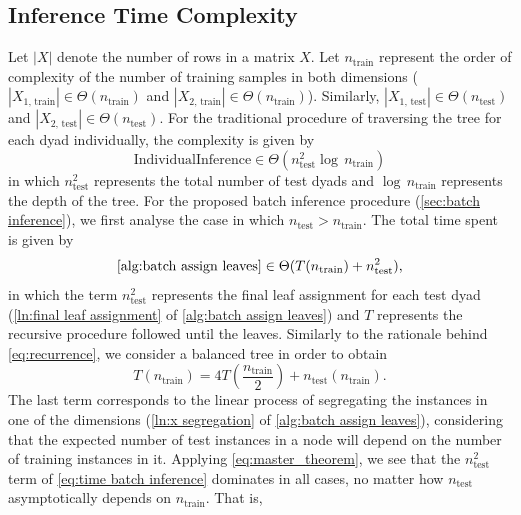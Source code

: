 \begin{appendices}
\subsection{Inference Time Complexity}
\label{sec:predict complexity analysis}
Let $|X|$ denote the number of rows in a matrix $X$.
Let $n_\text{train}$ represent the order of complexity of the number of training samples in both dimensions ($|X_\text{1, train}| \in \Theta(n_\text{train})$ and $|X_\text{2, train}| \in \Theta(n_\text{train})$). Similarly, $|X_\text{1, test}| \in \Theta(n_\text{test})$ and $|X_\text{2, test}| \in \Theta(n_\text{test})$.
For the traditional procedure of traversing the tree for each dyad individually, the complexity is given by
\begin{equation}
    \text{IndividualInference} \in \Theta(n_\text{test}^2\log\, n_\text{train})
\end{equation}
in which $n_\text{test}^2$ represents the total number of test dyads and $\log\, n_\text{train}$ represents the depth of the tree.
For the proposed batch inference procedure (\cref{sec:batch inference}), we first analyse the case in which $n_\text{test} > n_\text{train}$. The total time spent is given by
\begin{equation}
    \label{eq:time batch inference}
    \text{\ref{alg:batch assign leaves}}%
    \in \Theta( T(n_\text{train}) + n_\text{test}^2)
    \text{,}
\end{equation}
%
in which the term $n_\text{test}^2$ represents the final leaf assignment for each test dyad (\cref{ln:final leaf assignment} of \cref{alg:batch assign leaves}) and $T$ represents the recursive procedure followed until the leaves. Similarly to the rationale behind \cref{eq:recurrence}, we consider a balanced tree in order to obtain
%
\begin{equation}
    T(n_\text{train}) = 4T\left(\frac{n_\text{train}}{2}\right) + n_\text{test}(n_\text{train})
    \text{.}
    \label{eq:recurrence predict}
\end{equation}
%
The last term corresponds to the linear process of segregating the instances in one of the dimensions (\cref{ln:x segregation} of \cref{alg:batch assign leaves}), considering that the expected number of test instances in a node will depend on the number of training instances in it.
Applying \cref{eq:master_theorem}, we see that the $n_\text{test}^2$ term of \cref{eq:time batch inference} dominates in all cases, no matter how $n_\text{test}$ asymptotically depends on $n_\text{train}$. That is,

\end{appendices}
